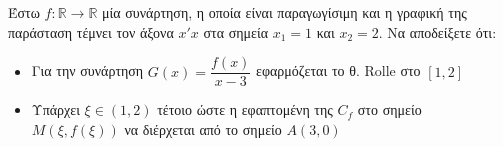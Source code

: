 \documentclass{presentation}
\begin{document}
\begin{askisi}
    Έστω $f:\mathbb{R}\to\mathbb{R}$ μία συνάρτηση, η οποία είναι παραγωγίσιμη και η γραφική της παράσταση τέμνει τον άξονα $x'x$ στα σημεία $x_1=1$ και $x_2=2$. Να αποδείξετε ότι:
    \begin{itemize}
        \item Για την συνάρτηση $G(x)=\dfrac{f(x)}{x-3}$ εφαρμόζεται το θ. Rolle στο $[1,2]$
        \item Υπάρχει $ξ\in (1,2)$ τέτοιο ώστε η εφαπτομένη της $C_f$ στο σημείο $Μ(ξ,f(ξ))$ να διέρχεται από το σημείο $Α(3,0)$
    \end{itemize}
\end{askisi}
\end{document}
